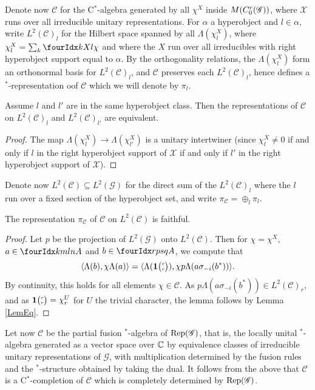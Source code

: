 Denote now $\mathcal{C}$ for the C$^*$-algebra generated by all $\chi^X$ inside $M(C^{r}_{0}(\mathscr{G}))$, where $\mathscr{X}$ runs over all irreducible unitary representations. For $\alpha$ a hyperobject and $l\in \alpha$, write  $L^2(\mathcal{C})_l$ for the Hilbert space spanned by all $\Lambda(\chi^X_l)$, where $\chi^X_l = \sum_{k} \Gr{\chi}{}{X}{k}{l}$ and where the $X$ run over all irreducibles with right hyperobject support equal to $\alpha$. By the orthogonality relations, the $\Lambda(\chi^X_l)$ form an orthonormal basis for $L^2(\mathcal{C})_l$, and $\mathcal{C}$ preserves each $L^2(\mathcal{C})_l$, hence defines a $^*$-representation oof $\mathcal{C}$ which we will denote by $\pi_l$. 

\begin{Lem}\label{LemEq} Assume $l$ and $l'$ are in the same hyperobject class. Then the representations of $\mathcal{C}$ on $L^2(\mathcal{C})_l$ and $L^2(\mathcal{C})_{l'}$ are equivalent.
\end{Lem} 
\begin{proof} The map $\Lambda(\chi^X_l)\rightarrow \Lambda(\chi^X_{l'})$ is a unitary intertwiner (since $\chi^X_l\neq 0$ if and only if $l$ in the right hyperobject support of $\mathscr{X}$ if and only if $l'$ in the right hyperobject support of $\mathscr{X}$).
\end{proof} 

Denote now $L^2(\mathcal{C})\subseteq L^2(\mathscr{G})$ for the direct sum of the $L^2(\mathcal{C})_l$ where the $l$ run over a fixed section of the hyperobject set, and write $\pi_{\mathcal{C}}= \oplus_l \pi_l$. 
 
\begin{Lem} The representation $\pi_{\mathcal{C}}$ of $\mathcal{C}$ on $L^2(\mathcal{C})$ is faithful.
\end{Lem} 

\begin{proof} Let $p$ be the projection of $L^2(\mathscr{G})$ onto $L^2(\mathcal{C})$. Then for $\chi = \chi^X$, $a\in \Gr{A}{k}{l}{m}{n}$ and $b\in \Gr{A}{r}{s}{p}{q}$, we compute that \[\langle \Lambda(b),\chi \Lambda(a)\rangle =  \langle \Lambda( \mathbf{1}{\tiny {\begin{pmatrix} r\\r\end{pmatrix}}}),\chi p\Lambda(a\sigma_{-i}(b^*))\rangle.\] By continuity, this holds for all elements $\chi \in \mathcal{C}$. As $p\Lambda(a\sigma_{-i}(b^*)) \in L^2(\mathcal{C})_r$, and as $\mathbf{1}{\tiny {\begin{pmatrix} r\\r\end{pmatrix}}} = \chi^U_r$ for $U$ the trivial character, the lemma follows by Lemma \ref{LemEq}.
\end{proof}

Let now $\mathscr{C}$ be the partial fusion $^*$-algebra of $\mathrm{Rep}(\mathscr{G})$, that is, the locally unital $^*$-algebra generated as a vector space over $\mathbb{C}$ by equivalence classes of irreducible unitary representations of $\mathscr{G}$, with multiplication determined by the fusion rules and the $^*$-structure obtained by taking the dual. It follows from the above that $\mathcal{C}$ is a C$^*$-completion of $\mathscr{C}$ which is completely determined by $\mathrm{Rep}(\mathscr{G})$.

